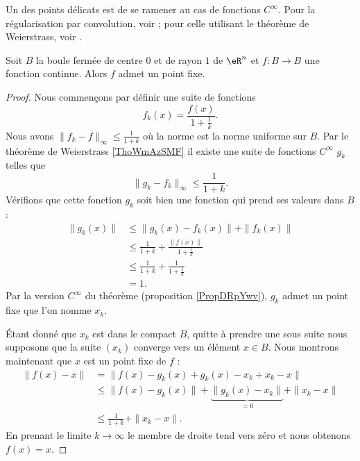 Un des points délicats est de se ramener au cas de fonctions \( C^{\infty}\). Pour la régularisation par convolution, voir \cite{AllardBrouwer}; pour celle utilisant le théorème de Weierstrass, voir \cite{KuttlerTopInAl}.
\begin{theorem}[Brouwer]\label{ThoRGjGdO}
    Soit \( B\) la boule fermée de centre \( 0\) et de rayon \( 1\) de \( \eR^n\) et \( f\colon B\to B\) une fonction continue. Alors \( f\) admet un point fixe.
\end{theorem}

\begin{proof}
    Nous commençons par définir une suite de fonctions
    \begin{equation}
        f_k(x)=\frac{ f(x) }{ 1+\frac{1}{ k } }.
    \end{equation}
    Nous avons \( \| f_k-f \|_{\infty}\leq \frac{1}{ 1+k }\) où la norme est la norme uniforme sur \( B\). Par le théorème de Weierstrass \ref{ThoWmAzSMF} il existe une suite de fonctions \(  C^{\infty}\) \( g_k\) telles que
    \begin{equation}
        \|  g_k-f_k\|_{\infty}\leq\frac{1}{ 1+k }.
    \end{equation}
    Vérifions que cette fonction \( g_k\) soit bien une fonction qui prend ses valeurs dans \( B\) :
    \begin{subequations}
        \begin{align}
            \| g_k(x) \|&\leq \| g_k(x)-f_k(x) \|+\| f_k(x) \|\\
            &\leq \frac{1}{ 1+k }+\frac{ \| f(x) \| }{ 1+\frac{1}{ k } }\\
            &\leq \frac{1}{ 1+k}+\frac{1}{ 1+\frac{1}{ k } }\\
            &=1.
        \end{align}
    \end{subequations}
    Par la version \(  C^{\infty}\) du théorème (proposition \ref{PropDRpYwv}), \( g_k\) admet un point fixe que l'on nomme \( x_k\).

    Étant donné que \( x_k\) est dans le compact \( B\), quitte à prendre une sous suite nous supposons que la suite \( (x_k)\) converge vers un élément \( x\in B\). Nous montrons maintenant que \( x\) est un point fixe de \( f\) :
    \begin{subequations}
        \begin{align}
            \| f(x)-x \|&=\| f(x)-g_k(x)+g_k(x)-x_k+x_k-x \|\\
            &\leq \| f(x)-g_k(x) \| +\underbrace{\| g_k(x)-x_k \|}_{=0}+\| x_k-x \|\\
            &\leq \frac{1}{ 1+k }+\| x_k-x \|.
        \end{align}
    \end{subequations}
    En prenant le limite \( k\to\infty\) le membre de droite tend vers zéro et nous obtenons \( f(x)=x\).
\end{proof}

